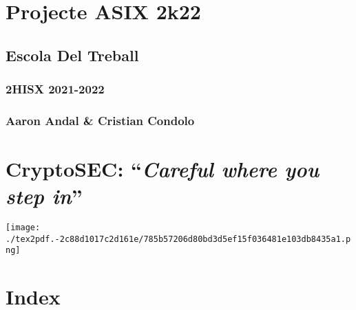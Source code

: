 \documentclass[]{article}
\date{}
\begin{document}
\hypertarget{projecte-asix-2k22}{%
\section{\texorpdfstring{\textbf{Projecte ASIX
2k22}}{Projecte ASIX 2k22}}\label{projecte-asix-2k22}}

\hypertarget{escola-del-treball}{%
\subsection{\texorpdfstring{\textbf{Escola Del
Treball}}{Escola Del Treball}}\label{escola-del-treball}}

\hypertarget{hisx-2021-2022}{%
\subsubsection{\texorpdfstring{\textbf{2HISX
2021-2022}}{2HISX 2021-2022}}\label{hisx-2021-2022}}

\hypertarget{aaron-andal-cristian-condolo}{%
\subsubsection{\texorpdfstring{\textbf{Aaron Andal \& Cristian
Condolo}}{Aaron Andal \& Cristian Condolo}}\label{aaron-andal-cristian-condolo}}

\hypertarget{cryptosec-careful-where-you-step-in}{%
\section{\texorpdfstring{\textbf{CryptoSEC}: ``\emph{Careful where you
step
in}''}{CryptoSEC: ``Careful where you step in''}}\label{cryptosec-careful-where-you-step-in}}

\texttt{[image: ./tex2pdf.-2c88d1017c2d161e/785b57206d80bd3d5ef15f036481e103db8435a1.png]}

\hypertarget{index}{%
\section{\texorpdfstring{\textbf{Index}}{Index}}\label{index}}
\end{document}
